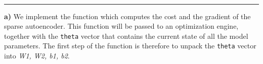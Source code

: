 \documentclass[11pt]{article}
\begin{document}
    \begin{center}
    \end{center}
    { \hspace*{\fill} \\}
    
    \begin{center}\rule{0.5\linewidth}{\linethickness}\end{center}

\textbf{a)} We implement the function which computes the cost and the
gradient of the sparse autoencoder. This function will be passed to an
optimization engine, together with the \texttt{theta} vector that
contains the current state of all the model parameters. The first step
of the function is therefore to unpack the \texttt{theta} vector into
\emph{W1, W2, b1, b2}.
\end{document}
